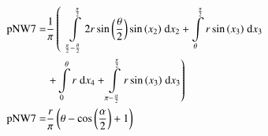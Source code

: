 \begin{align}
    \mathrm{pNW7} =&\frac{1}{\pi} \left(\;\;\int\limits_{\frac{\pi}{2} - \frac{\theta}{2}}^{\frac{\pi}{2}}2 r \sin{\left (\frac{\theta}{2} \right )} \sin{\left (x_{2} \right )}\;\mathrm{d}x_{2}+\int\limits_{\theta}^{\frac{\pi}{2}}r \sin{\left (x_{3} \right )}\;\mathrm{d}x_{3}\right.\notag\\
 &\left.+\int\limits_{0}^{\theta}r\;\mathrm{d}x_{4}+\int\limits_{\pi - \frac{\alpha}{2}}^{\frac{\pi}{2}}r \sin{\left (x_{3} \right )}\;\mathrm{d}x_{3}\right)\label{pNW7Def}\\
    \mathrm{pNW7} =& \frac{r}{\pi} \left(\theta - \cos{\left (\frac{\alpha}{2} \right )} + 1\right)\label{pNW7Sln}
\end{align}